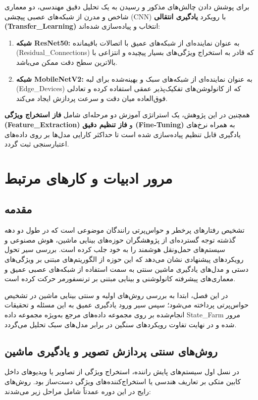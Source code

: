 \documentclass{report}
\begin{document}
 	برای پوشش دادن چالش‌های مذکور و رسیدن به یک تحلیل دقیق مهندسی، دو معماری شاخص و مدرن از شبکه‌های عصبی پیچشی (CNN) با رویکرد \textbf{یادگیری انتقالی (Transfer\_Learning)} انتخاب و پیاده‌سازی شده‌اند:
 	\begin{enumerate}
 		\item \textbf{شبکه ResNet50:} به عنوان نماینده‌ای از شبکه‌های عمیق با اتصالات باقیمانده (Residual\_Connections) که قادر به استخراج ویژگی‌های بسیار پیچیده و انتزاعی با بالاترین سطح دقت ممکن می‌باشد.
 		\item \textbf{شبکه MobileNetV2:} به عنوان نماینده‌ای از شبکه‌های سبک و بهینه‌شده برای لبه (Edge\_Devices) که از کانولوشن‌های تفکیک‌پذیر عمقی استفاده کرده و تعادلی فوق‌العاده میان دقت و سرعت پردازش ایجاد می‌کند.
 	\end{enumerate}
 	
 	همچنین در این پژوهش، یک استراتژی آموزش دو مرحله‌ای شامل \textbf{فاز استخراج ویژگی (Feature\_Extraction)} و \textbf{فاز تنظیم دقیق (Fine-Tuning)} به همراه نرخ‌های یادگیری قابل تنظیم پیاده‌سازی شده است تا حداکثر کارایی مدل‌ها بر روی داده‌های اعتبارسنجی ثبت گردد.
 	
 	
 	\chapter{مرور ادبیات و کارهای مرتبط}
 	
 	\section{مقدمه}
 	تشخیص رفتارهای پرخطر و حواس‌پرتی رانندگان موضوعی است که در طول دو دهه گذشته توجه گسترده‌ای از پژوهشگران حوزه‌های بینایی ماشین، هوش مصنوعی و سیستم‌های حمل‌ونقل هوشمند را به خود جلب کرده است. بررسی سیر تحول رویکردهای پیشنهادی نشان می‌دهد که این حوزه از الگوریتم‌های مبتنی بر ویژگی‌های دستی و مدل‌های یادگیری ماشین سنتی به سمت استفاده از شبکه‌های عصبی عمیق و معماری‌های پیشرفته کانولوشنی و بینایی مبتنی بر ترنسفورمر حرکت کرده است.
 	
 	در این فصل، ابتدا به بررسی روش‌های اولیه و سنتی بینایی ماشین در تشخیص حواس‌پرتی پرداخته می‌شود؛ سپس سیر ورود یادگیری عمیق به این مسئله و تحقیقات انجام‌شده بر روی مجموعه داده‌های مرجع به‌ویژه مجموعه داده State\_Farm مرور شده و در نهایت تفاوت رویکردهای سنگین در برابر مدل‌های سبک تحلیل می‌گردد.
 	
 	\section{روش‌های سنتی پردازش تصویر و یادگیری ماشین}
 	در نسل اول سیستم‌های پایش راننده، استخراج ویژگی از تصاویر یا ویدیوهای داخل کابین متکی بر تعاریف هندسی یا استخراج‌کننده‌های ویژگی دست‌ساز بود. روش‌های رایج در این دوره عمدتاً شامل مراحل زیر می‌شدند:
 	
\end{document}
